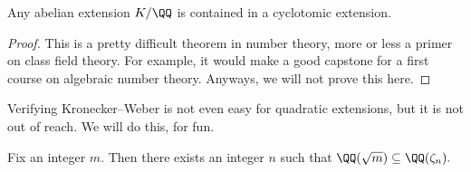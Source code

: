 \begin{theorem}
	Any abelian extension $K/\QQ$ is contained in a cyclotomic extension.
\end{theorem}
\begin{proof}
	This is a pretty difficult theorem in number theory, more or less a primer on class field theory. For example, it would make a good capstone for a first course on algebraic number theory. Anyways, we will not prove this here.
\end{proof}
Verifying Kronecker--Weber is not even easy for quadratic extensions, but it is not out of reach. We will do this, for fun.
\begin{exe}[Nir] \label{exe:quadratickw}
	Fix an integer $m.$ Then there exists an integer $n$ such that $\QQ(\sqrt m)\subseteq\QQ(\zeta_n).$
\end{exe}
